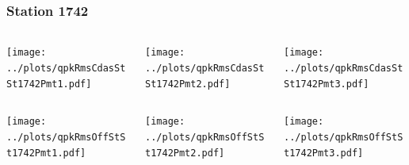 \documentclass[aspectratio=169]{beamer}
\begin{document}
\begin{frame} 
  \frametitle{Station 1742}
  \begin{center}
    \begin{columns}
      \begin{column}{0.33\textwidth}
        \texttt{[image: ../plots/qpkRmsCdasStSt1742Pmt1.pdf]}
      \end{column}
      \begin{column}{0.33\textwidth}
        \texttt{[image: ../plots/qpkRmsCdasStSt1742Pmt2.pdf]}
      \end{column}
      \begin{column}{0.33\textwidth}
        \texttt{[image: ../plots/qpkRmsCdasStSt1742Pmt3.pdf]}
      \end{column}
    \end{columns}
  \end{center}

  \begin{center}
    \begin{columns}
      \begin{column}{0.33\textwidth}
        \texttt{[image: ../plots/qpkRmsOffStSt1742Pmt1.pdf]}
      \end{column}
      \begin{column}{0.33\textwidth}
        \texttt{[image: ../plots/qpkRmsOffStSt1742Pmt2.pdf]}
      \end{column}
      \begin{column}{0.33\textwidth}
        \texttt{[image: ../plots/qpkRmsOffStSt1742Pmt3.pdf]}
      \end{column}
    \end{columns}
  \end{center}
\end{frame}
\end{document}
